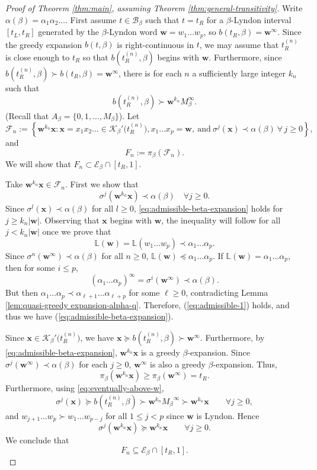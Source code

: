\documentclass[11pt]{amsart}
\theoremstyle{definition}
\theoremstyle{remark}
\numberwithin{equation}{section}
\renewcommand{\L}{\ensuremath{\mathbb{L}}}
\newcommand{\BB}{\mathscr{B}}
\newcommand{\EE}{\mathscr{E}}
\newcommand{\w}{\mathbf{w}}
\newcommand{\x}{\mathbf{x}}
\newcommand{\f}{\infty}
\newcommand{\al}{\alpha}
\newcommand{\lle}{\preccurlyeq}
\newcommand{\lge}{\succcurlyeq}
\newcommand{\si}{\sigma}
\begin{document}
\begin{proof}[Proof of Theorem \ref{thm:main}, assuming Theorem \ref{thm:general-transitivity}]
Write $\al(\beta)=\al_1\al_2\dots$.
First assume $t\in\BB_\beta$ such that $t=t_R$ for a $\beta$-Lyndon interval $[t_L,t_R]$ generated by the $\beta$-Lyndon word $\w=w_1\dots w_p$, so $b(t_R,\beta)=\w^\f$. Since the greedy expansion $b(t,\beta)$ is right-continuous in $t$, we may assume that $t_R^{(n)}$ is close enough to $t_R$ so that $b(t_R^{(n)},\beta)$ begins with $\w$. Furthermore, since $b(t_R^{(n)},\beta)\succ b(t_R,\beta)=\w^\f$, there is for each $n$ a sufficiently large integer $k_n$ such that
\begin{equation} \label{eq:eventually-above-w}
b(t_R^{(n)},\beta)\succ \w^{k_n}{M_\beta^\f}.
\end{equation}
{(Recall that $A_\beta=\{0,1,\dots,M_\beta\}$)}. Let
\[
\mathcal{F}_n:=\left\{\w^{k_n}\x: \x=x_1x_2\dots\in \mathcal{K}_\beta'\big(t_R^{(n)}\big), x_1\dots x_p=\w,\ \mbox{and}\  \si^j(\x)\prec \al(\beta)\ \forall\,j\geq 0\right\},
\]
and
\[
F_n:=\pi_\beta(\mathcal{F}_n).
\]
{We will show that $F_n\subset \EE_\beta\cap[t_R, 1]$.}

Take $\w^{k_n}\x\in\mathcal{F}_n$. First we show that
\begin{equation} \label{eq:admissible-beta-expansion}
  \si^j(\w^{k_n}\x)\prec\al(\beta) \quad\forall j\ge 0.
\end{equation}
Since $\si^l(\x)\prec\al(\beta)$ for all $l\geq 0$, \eqref{eq:admissible-beta-expansion} holds for $j\geq k_n|\w|$. Observing that $\x$ begins with $\w$, the inequality will follow for all $j<k_n|\w|$ once we prove that
\begin{equation} \label{eq:admissible-1}
\L(\w)=\L(w_1\ldots w_p)\prec \al_1\ldots \al_p.
\end{equation}
Since $\si^n(\w^\f)\prec \al(\beta)$ for all $n\ge 0$, $\L(\w)\lle \al_1\ldots \al_p$. If $\L(\w)=\al_1\ldots \al_p$, then for some $i\leq p$,
\[
(\al_1\ldots \al_p)^\f=\si^i(\w^\f)\prec \al(\beta).
\]
But then $\al_1\ldots \al_p\prec \al_{\ell+1}\ldots \al_{\ell+p}$ for some $\ell\ge 0$, contradicting Lemma \ref{lem:quasi-greedy expansion-alpha-q}. Therefore, (\ref{eq:admissible-1}) holds, and thus we have (\ref{eq:admissible-beta-expansion}).

Since $\x\in \mathcal{K}_\beta'\big(t_R^{(n)}\big)$, we have $\x\lge b(t_R^{(n)},\beta)\succ \w^\f$. Furthermore, by \eqref{eq:admissible-beta-expansion}, $\w^{k_n}\x$ is a greedy $\beta$-expansion. Since $\si^j(\w^\f)\prec \al(\beta)$ for each $j\geq 0$, $\w^\f$ is also a greedy $\beta$-expansion. Thus,
\[
\pi_\beta(\w^{k_n}\x)\geq\pi_\beta (\w^\f)=t_R.
\]
Furthermore, using \eqref{eq:eventually-above-w},
\[
\sigma^j(\x)\lge b(t_R^{(n)},\beta)\succ \w^{k_n}{M_\beta}^\f\succ \w^{k_n}\x \qquad \forall j\geq 0,
\]
and $w_{j+1}\dots w_p\succ w_1\dots w_{p-j}$ for all $1\leq j<p$ since $\w$ is Lyndon. Hence
\[
\sigma^j(\w^{k_n}\x)\lge \w^{k_n}\x \qquad\forall j\geq 0.
\]
We conclude that
\begin{equation} \label{eq:containment}
F_n\subseteq \EE_\beta\cap[t_R,1].
\end{equation}


\end{proof}
\end{document}
